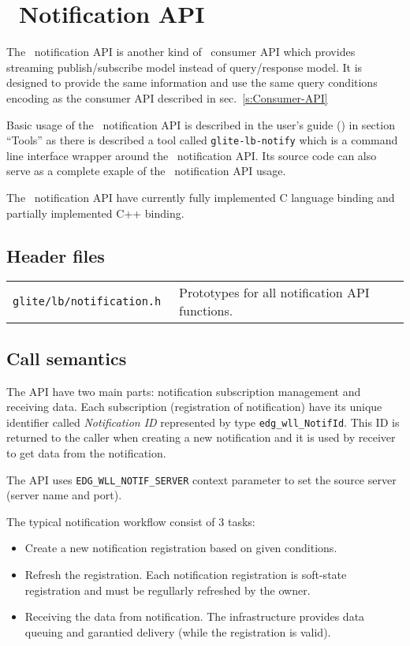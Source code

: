 
\section{\LB\ Notification API}
\label{s:Notification-API}

The \LB\ notification API is another kind of \LB\ consumer API which
provides streaming publish/subscribe model instead of query/response
model. It is designed to provide the same information and use the same
query conditions encoding as the consumer API described in
sec.~\ref{s:Consumer-API}

Basic usage of the \LB\ notification API is described in the \LB
user's guide (\cite{lbug}) in section ``Tools'' as there is described
a tool called \verb'glite-lb-notify' which is a command line interface
wrapper around the \LB\ notification API. Its source code can also
serve as a complete exaple of the \LB\ notification API usage.

The \LB\ notification API have currently fully implemented C language
binding and partially implemented C++ binding.

\subsection{Header files}
\begin{table}[h]
\begin{tabularx}{\textwidth}{>{\tt}lX}
glite/lb/notification.h & Prototypes for all notification API functions. \\
\end{tabularx}
\end{table}

\subsection{Call semantics}
The API have two main parts: notification subscription management and
receiving data. Each subscription (registration of notification) have
its unique identifier called \emph{Notification ID} represented by
type \verb'edg_wll_NotifId'. This ID is returned to the caller when
creating a new notification and it is used by receiver to get data
from the notification.

The API uses \verb'EDG_WLL_NOTIF_SERVER' context parameter to set the
source server (\LB server name and port). 

The typical notification workflow consist of 3 tasks:
\begin{itemize}
 \item Create a new notification registration based on given conditions.
 \item Refresh the registration. Each notification registration is
  soft-state registration and must be regullarly refreshed by the
  owner.
 \item Receiving the data from notification. The \LB infrastructure
  provides data queuing and garantied delivery (while the registration
  is valid).
\end{itemize}

